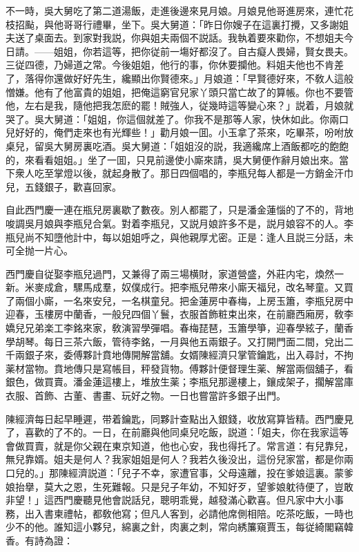 不一時，吳大舅吃了第二道湯飯，走進後邊來見月娘。月娘見他哥進房來，連忙花枝招颭，與他哥哥行禮畢，坐下。吳大舅道：「昨日你嫂子在這裏打攪，又多謝姐夫送了桌面去。到家對我説，你與姐夫兩個不説話。我執着要來勸你，不想姐夫今日請。——姐姐，你若這等，把你従前一塲好都沒了。自古癡人畏婦，賢女畏夫。三従四德，乃婦道之常。今後姐姐，他行的事，你休要攔他。料姐夫他也不肯差了，落得你還做好好先生，纔顯出你賢德來。」月娘道：「早賢德好來，不敎人這般憎嫌。他有了他富貴的姐姐，把俺這窮官兒家丫頭只當亡故了的算帳。你也不要管他，左右是我，隨他把我怎麽的罷！賊強人，従幾時這等變心來？」説着，月娘就哭了。吳大舅道：「姐姐，你這個就差了。你我不是那等人家，快休如此。你兩口兒好好的，俺們走來也有光輝些！」勸月娘一囬。小玉拿了茶來，吃畢茶，吩咐放桌兒，留吳大舅房裏吃酒。吳大舅道：「姐姐沒的説，我適纔席上酒飯都吃的飽飽的，來看看姐姐。」坐了一囬，只見前邊使小廝來請，吳大舅便作辭月娘出來。當下衆人吃至掌燈以後，就起身散了。那日四個唱的，李瓶兒每人都是一方銷金汗巾兒，五錢銀子，歡喜回家。

自此西門慶一連在瓶兒房裏歇了數夜。別人都罷了，只是潘金蓮惱的了不的，背地唆調吳月娘與李瓶兒合氣。對着李瓶兒，又説月娘許多不是，説月娘容不的人。李瓶兒尚不知墮他計中，每以姐姐呼之，與他親厚尤密。正是：逢人且説三分話，未可全抛一片心。

西門慶自従娶李瓶兒過門，又兼得了兩三場横財，家道營盛，外莊内宅，煥然一新。米麥成倉，騾馬成羣，奴僕成行。把李瓶兒帶來小廝天福兒，改名琴童。又買了兩個小廝，一名來安兒，一名棋童兒。把金蓮房中春梅，上房玉簫，李瓶兒房中迎春，玉樓房中蘭香，一般兒四個丫鬟，衣服首飾粧束出來，在前廳西廂房，敎李嬌兒兄弟楽工李銘來家，敎演習學彈唱。春梅琵琶，玉簫學箏，迎春學絃子，蘭香學胡琴。每日三茶六飯，管待李銘，一月與他五兩銀子。又打開門面二間，兌出二千兩銀子來，委傅夥計賁地傳開解當舖。女婿陳經濟只掌管鑰匙，出入尋討，不拘薬材當物。賁地傳只是寫帳目，秤發貨物。傅夥計便督理生薬、解當兩個舖子，看銀色，做買賣。潘金蓮這樓上，堆放生薬；李瓶兒那邊樓上，鑲成架子，擱解當庫衣服、首飾、古董、書畫、玩好之物。一日也嘗當許多銀子出門。

陳經濟每日起早睡遲，带着鑰匙，同夥計查點出入銀錢，收放寫算皆精。西門慶見了，喜歡的了不的。一日，在前廳與他同桌兒吃飯，説道：「姐夫，你在我家這等會做買賣，就是你父親在東京知道，他也心安，我也得托了。常言道：有兒靠兒，無兒靠婿。姐夫是何人？我家姐姐是何人？我若久後没出，這份兒家當，都是你兩口兒的。」那陳經濟説道：「兒子不幸，家遭官事，父母遠離，投在爹娘這裏。蒙爹娘抬擧，莫大之恩，生死難報。只是兒子年幼，不知好歹，望爹娘躭待便了，豈敢非望！」這西門慶聽見他會説話兒，聰明乖覺，越發滿心歡喜。但凡家中大小事務，出入書柬禮帖，都敎他寫；但凡人客到，必請他席側相陪。吃茶吃飯，一時也少不的他。誰知這小夥兒，綿裏之針，肉裏之刺，常向綉簾窺賈玉，每従綺閣竊韓香。有詩為證：

